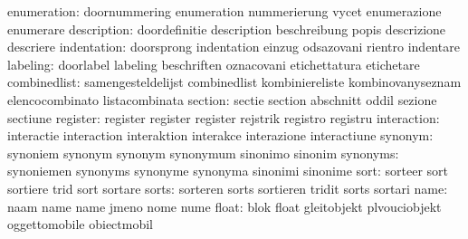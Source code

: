               enumeration: doornummering             enumeration
                           nummerierung              vycet
                           enumerazione              enumerare
              description: doordefinitie             description
                           beschreibung              popis
                           descrizione               descriere
              indentation: doorsprong                indentation
                           einzug                    odsazovani
                           rientro                   indentare
                 labeling: doorlabel                 labeling
                           beschriften               oznacovani
                           etichettatura             etichetare
             combinedlist: samengesteldelijst        combinedlist
                           kombiniereliste           kombinovanyseznam
                           elencocombinato           listacombinata
                  section: sectie                    section
                           abschnitt                 oddil
                           sezione                   sectiune
                 register: register                  register
                           register                  rejstrik
                           registro                  registru
              interaction: interactie                interaction
                           interaktion               interakce
                           interazione               interactiune
                  synonym: synoniem                  synonym
                           synonym                   synonymum
                           sinonimo                  sinonim
                 synonyms: synoniemen                synonyms
                           synonyme                  synonyma
                           sinonimi                  sinonime
                     sort: sorteer                   sort
                           sortiere                  trid
                           sort                      sortare %
                    sorts: sorteren                  sorts
                           sortieren                 tridit
                           sorts                     sortari %
                     name: naam                      name
                           name                      jmeno
                           nome                      nume
                    float: blok                      float
                           gleitobjekt               plvouciobjekt
                           oggettomobile             obiectmobil
